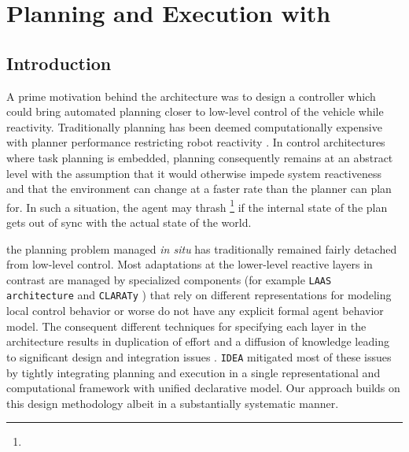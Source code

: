 \section{Planning and Execution with \rx}
\label{sec:arch}

\subsection{Introduction}
\label{sec:arch:intro}

A prime motivation behind the \rx architecture was to design a
controller which could bring automated planning closer to low-level
control of the vehicle while 
reactivity. Traditionally planning has been deemed computationally
expensive with planner performance restricting robot reactivity
\cite{ghallab04,Dias:2003ua}. In control architectures where task
planning is embedded, planning consequently remains at an abstract
level with the assumption that it would otherwise impede system
reactiveness and that the environment can change at a faster rate than
the planner can plan for. In such a situation, the agent may thrash
\footnote{}  if the internal state of the plan gets out of sync with the
actual state of the world.

 the planning
problem managed {\em in situ} has traditionally remained fairly
detached from low-level control. Most adaptations at the lower-level
reactive layers in contrast are managed by specialized components (for
example \texttt{LAAS architecture} \cite{alami:1998p820,Ingrand07} and
\texttt{CLARATy} \cite{Nesnas:2003do}) that rely on different
representations for modeling local control behavior or worse do not
have any explicit formal agent behavior model. The consequent
different techniques for specifying each layer in the architecture
results in duplication of effort and a diffusion of knowledge leading
to significant design and integration issues \cite{DS1report}.
\texttt{IDEA} mitigated most of these issues by tightly integrating
planning and execution in a single representational and computational
framework with  unified declarative model. Our approach
builds on this design methodology albeit in a substantially systematic
manner.

